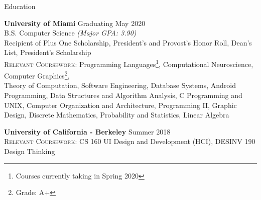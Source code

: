 \documentclass{resume} %
\begin{document}

\begin{rSection}{Education}

{\bf University of Miami} \hfill Graduating May 2020 
\\B.S. Computer Science \textit{(Major GPA: 3.90)}  \\
Recipient of Plus One Scholarship, President's and Provost's Honor Roll, Dean's List, President's Scholarship \\
\textsc{Relevant Coursework}: Programming Languages\footnote{Courses currently taking in Spring 2020\label{first_footnote}}, Computational Neuroscience, Computer Graphics\footnote{Grade: A+\label{second_footnote}}, \\
Theory of Computation, Software Engineering, Database Systems, Android Programming, Data Structures and Algorithm Analysis, C Programming and UNIX, Computer Organization and Architecture, Programming II, Graphic Design,
Discrete Mathematics, Probability and Statistics, Linear Algebra

{\bf University of California - Berkeley} \hfill Summer 2018 \\
\textsc{Relevant Coursework}: CS 160 UI Design and Development (HCI), DESINV 190 Design Thinking

\end{rSection}


\end{document}
